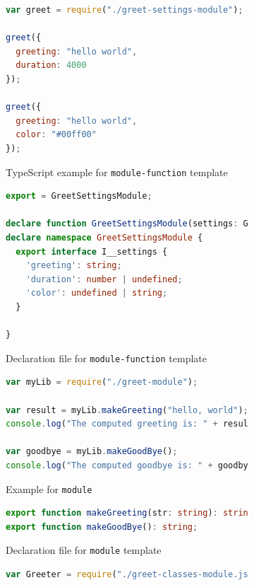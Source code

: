 \documentclass[english,cleveref,autoref,submission]{programming}
\begin{document}
\begin{figure}[tp]
  \centering
  \begin{subfigure}{0.48\linewidth}
    \begin{lstlisting}[language=JavaScript]
var greet = require("./greet-settings-module");

greet({
  greeting: "hello world",
  duration: 4000
});

greet({
  greeting: "hello world",
  color: "#00ff00"
});
    \end{lstlisting}
    \caption{TypeScript example for \texttt{module-function} template}
  \end{subfigure}
  \hfill
  \begin{subfigure}{0.48\linewidth}
    \begin{lstlisting}[language=TypeScript]
export = GreetSettingsModule;

declare function GreetSettingsModule(settings: GreetSettingsModule.I__settings): void;
declare namespace GreetSettingsModule {
  export interface I__settings {
    'greeting': string;
    'duration': number | undefined;
    'color': undefined | string;
  }

}
    \end{lstlisting}
    \caption{Declaration file for \texttt{module-function} template}
  \end{subfigure}

  \begin{subfigure}{0.48\linewidth}
      \begin{lstlisting}[language=JavaScript]
var myLib = require("./greet-module");

var result = myLib.makeGreeting("hello, world");
console.log("The computed greeting is: " + result);

var goodbye = myLib.makeGoodBye();
console.log("The computed goodbye is: " + goodbye);    
      \end{lstlisting}
      \caption{Example for \texttt{module}}
    \end{subfigure}
    \hfill
    \begin{subfigure}{0.48\linewidth}
      \begin{lstlisting}[language=TypeScript]
export function makeGreeting(str: string): string;
export function makeGoodBye(): string;        
      \end{lstlisting}
      \caption{Declaration file for \texttt{module} template}
    \end{subfigure}

    \begin{subfigure}{0.48\linewidth}
      \begin{lstlisting}[language=JavaScript]
var Greeter = require("./greet-classes-module.js");


\end{lstlisting}
\end{subfigure}
\end{figure}
\end{document}
